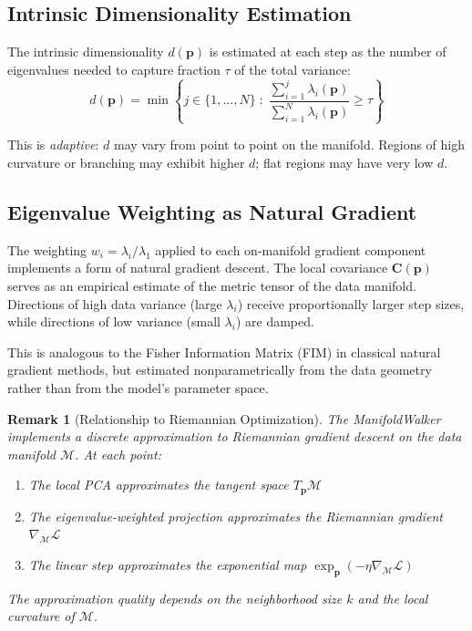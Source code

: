 \documentclass[11pt,letterpaper]{article}
\newtheorem{remark}{Remark}[section]
\newcommand{\pos}{\mathbf{p}}
\newcommand{\grad}{\nabla}
\newcommand{\manifold}{\mathcal{M}}
\newcommand{\tangent}{T}
\newcommand{\obj}{\mathcal{L}}
\newcommand{\cov}{\mathbf{C}}
\begin{document}
\subsection{Intrinsic Dimensionality Estimation}

The intrinsic dimensionality $d(\pos)$ is estimated at each step as the
number of eigenvalues needed to capture fraction $\tau$ of the total
variance:
\begin{equation}
  d(\pos) = \min \left\{ j \in \{1, \ldots, N\} \;:\; \frac{\sum_{i=1}^{j} \lambda_i(\pos)}{\sum_{i=1}^{N} \lambda_i(\pos)} \geq \tau \right\}
\end{equation}

This is \emph{adaptive}: $d$ may vary from point to point on the manifold.
Regions of high curvature or branching may exhibit higher $d$; flat
regions may have very low $d$.

\subsection{Eigenvalue Weighting as Natural Gradient}

The weighting $w_i = \lambda_i / \lambda_1$ applied to each on-manifold
gradient component implements a form of natural gradient descent. The
local covariance $\cov(\pos)$ serves as an empirical estimate of the
metric tensor of the data manifold. Directions of high data variance
(large $\lambda_i$) receive proportionally larger step sizes, while
directions of low variance (small $\lambda_i$) are damped.

This is analogous to the Fisher Information Matrix (FIM) in classical
natural gradient methods, but estimated nonparametrically from the
data geometry rather than from the model's parameter space.

\begin{remark}[Relationship to Riemannian Optimization]
The ManifoldWalker implements a discrete approximation to Riemannian
gradient descent on the data manifold $\manifold$. At each point:
\begin{enumerate}[nosep]
  \item The local PCA approximates the tangent space $\tangent_\pos\manifold$
  \item The eigenvalue-weighted projection approximates the Riemannian gradient $\grad_{\manifold}\obj$
  \item The linear step approximates the exponential map $\exp_\pos(-\eta \grad_\manifold\obj)$
\end{enumerate}
The approximation quality depends on the neighborhood size $k$ and the
local curvature of $\manifold$.
\end{remark}
\end{document}
